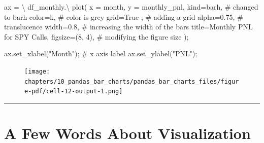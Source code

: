 \documentclass[
  letterpaper,
  DIV=11,
  numbers=noendperiod]{scrreprt}
\newenvironment{Shaded}{\begin{snugshade}}{\end{snugshade}}
\newcommand{\CommentTok}[1]{\textcolor[rgb]{0.37,0.37,0.37}{#1}}
\newcommand{\DecValTok}[1]{\textcolor[rgb]{0.68,0.00,0.00}{#1}}
\newcommand{\FloatTok}[1]{\textcolor[rgb]{0.68,0.00,0.00}{#1}}
\newcommand{\NormalTok}[1]{\textcolor[rgb]{0.00,0.23,0.31}{#1}}
\newcommand{\OperatorTok}[1]{\textcolor[rgb]{0.37,0.37,0.37}{#1}}
\newcommand{\StringTok}[1]{\textcolor[rgb]{0.13,0.47,0.30}{#1}}
\newcommand{\VariableTok}[1]{\textcolor[rgb]{0.07,0.07,0.07}{#1}}
\begin{document}
\begin{Shaded}
\begin{Highlighting}[]
\NormalTok{ax }\OperatorTok{=} \OperatorTok{\textbackslash{}}
\NormalTok{    df\_monthly.}\OperatorTok{\textbackslash{}}
\NormalTok{        plot(}
\NormalTok{            x }\OperatorTok{=} \StringTok{\textquotesingle{}month\textquotesingle{}}\NormalTok{,}
\NormalTok{            y }\OperatorTok{=} \StringTok{\textquotesingle{}monthly\_pnl\textquotesingle{}}\NormalTok{,}
\NormalTok{            kind}\OperatorTok{=}\StringTok{\textquotesingle{}barh\textquotesingle{}}\NormalTok{, }\CommentTok{\# changed to barh}
\NormalTok{            color}\OperatorTok{=}\StringTok{\textquotesingle{}k\textquotesingle{}}\NormalTok{, }\CommentTok{\# color is grey}
\NormalTok{            grid}\OperatorTok{=}\VariableTok{True}\NormalTok{ , }\CommentTok{\# adding a grid}
\NormalTok{            alpha}\OperatorTok{=}\FloatTok{0.75}\NormalTok{, }\CommentTok{\# translucence}
\NormalTok{            width}\OperatorTok{=}\FloatTok{0.8}\NormalTok{, }\CommentTok{\# increasing the width of the bars}
\NormalTok{            title}\OperatorTok{=}\StringTok{\textquotesingle{}Monthly PNL for SPY Calls\textquotesingle{}}\NormalTok{,}
\NormalTok{            figsize}\OperatorTok{=}\NormalTok{(}\DecValTok{8}\NormalTok{, }\DecValTok{4}\NormalTok{), }\CommentTok{\# modifying the figure size}
\NormalTok{        )}\OperatorTok{;}

\NormalTok{ax.set\_xlabel(}\StringTok{"Month"}\NormalTok{)}\OperatorTok{;} \CommentTok{\# x axis label}
\NormalTok{ax.set\_ylabel(}\StringTok{"PNL"}\NormalTok{)}\OperatorTok{;} 
\end{Highlighting}
\end{Shaded}

\begin{figure}[H]

{\centering \texttt{[image: chapters/10\_pandas\_bar\_charts/pandas\_bar\_charts\_files/figure-pdf/cell-12-output-1.png]}

}

\end{figure}

\begin{center}\rule{0.5\linewidth}{0.5pt}\end{center}

\hypertarget{a-few-words-about-visualization}{%
\section{A Few Words About
Visualization}\label{a-few-words-about-visualization}}
\end{document}
